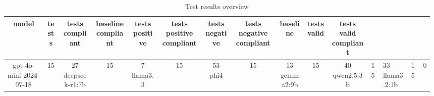 
  \begin{table}[h!]
  \centering
  \begin{tabular}{|c|c|c|c|c|c|c|c|c|c|c|}
  \hline
  model & tests & tests compliant & baseline compliant & tests positive & tests positive compliant & tests negative & tests negative compliant & baseline & tests valid & tests valid compliant \\
  \hline
  gpt-4o-mini-2024-07-18 & 15 & 27%
\hline
deepseek-r1:7b & 15 & 7%
\hline
llama3.3 & 15 & 53%
\hline
phi4 & 15 & 13%
\hline
gemma2:9b & 15 & 40%
\hline
qwen2.5:3b & 15 & 33%
\hline
llama3.2:1b & 15 & 0%
  \end{tabular}
  \caption{Test results overview}
  
  \end{table}
  